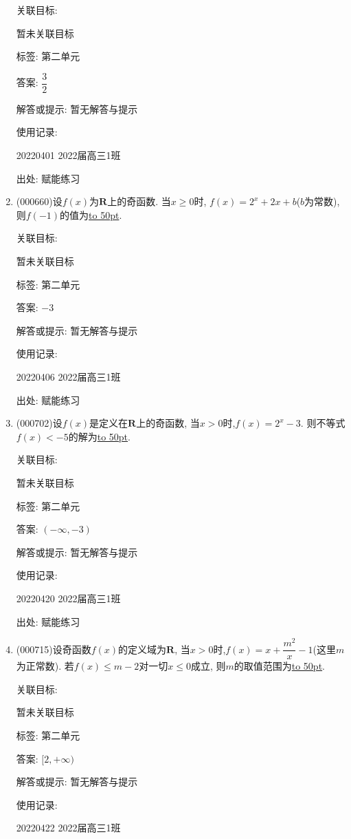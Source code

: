 \documentclass[10pt,a4paper]{article}
\newcommand{\blank}[1]{\underline{\hbox to #1pt{}}}
\begin{document}
\begin{enumerate}[1.]
关联目标:

暂未关联目标



标签: 第二单元

答案: $\dfrac 32$

解答或提示: 暂无解答与提示

使用记录:

20220401	2022届高三1班	


出处: 赋能练习
\item { (000660)}设$f(x)$为$\mathbf{R}$上的奇函数. 当$x\ge 0$时, $f(x)=2^x+2x+b$($b$为常数), 则$f(-1)$的值为\blank{50}.


关联目标:

暂未关联目标



标签: 第二单元

答案: $-3$

解答或提示: 暂无解答与提示

使用记录:

20220406	2022届高三1班	


出处: 赋能练习
\item { (000702)}设$f(x)$是定义在$\mathbf{R}$上的奇函数, 当$x>0$时,$f(x)=2^x-3$. 则不等式$f(x)<-5$的解为\blank{50}.


关联目标:

暂未关联目标



标签: 第二单元

答案: $(-\infty,-3)$

解答或提示: 暂无解答与提示

使用记录:

20220420	2022届高三1班	


出处: 赋能练习
\item { (000715)}设奇函数$f(x)$的定义域为$\mathbf{R}$, 当$x>0$时,$f(x)=x+\dfrac{m^2}x-1$(这里$m$为正常数). 若$f(x)\le m-2$对一切$x\le 0$成立, 则$m$的取值范围为\blank{50}.


关联目标:

暂未关联目标



标签: 第二单元

答案: $[2,+\infty)$

解答或提示: 暂无解答与提示

使用记录:

20220422	2022届高三1班	


\end{enumerate}
\end{document}
